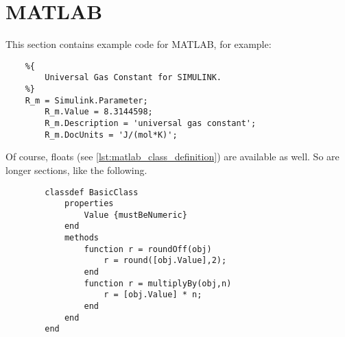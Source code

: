 \section{MATLAB}

This section contains example code for MATLAB, for example:
\begin{verbatim}
    %{
        Universal Gas Constant for SIMULINK.
    %}
    R_m = Simulink.Parameter;
        R_m.Value = 8.3144598;
        R_m.Description = 'universal gas constant';
        R_m.DocUnits = 'J/(mol*K)';
\end{verbatim}
Of course, floats (see \cref{lst:matlab_class_definition}) are available as well.
So are longer sections, like the following.

\begin{listing}
    \begin{verbatim}
        classdef BasicClass
            properties
                Value {mustBeNumeric}
            end
            methods
                function r = roundOff(obj)
                    r = round([obj.Value],2);
                end
                function r = multiplyBy(obj,n)
                    r = [obj.Value] * n;
                end
            end
        end
    \end{verbatim}
    \caption[A class definition in MATLAB]{%
        A class definition in MATLAB, from \cite{mathworksCreateSimpleClass2020}%
    }
    \label{lst:matlab_class_definition}
\end{listing}

